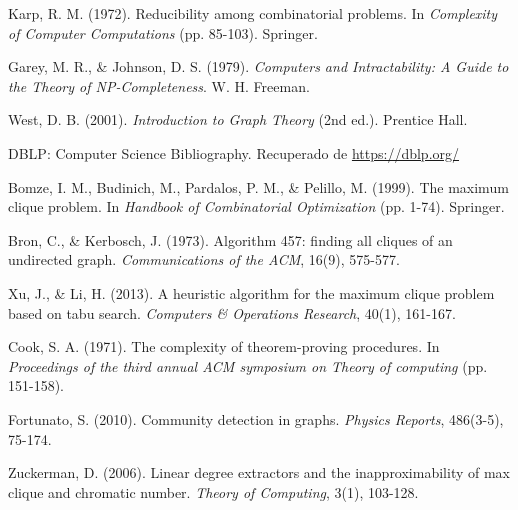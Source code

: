 \documentclass[12pt,a4paper]{report}
\begin{document}
\begin{thebibliography}{99}

Karp, R. M. (1972). Reducibility among combinatorial problems. In \textit{Complexity of Computer Computations} (pp. 85-103). Springer.

Garey, M. R., \& Johnson, D. S. (1979). \textit{Computers and Intractability: A Guide to the Theory of NP-Completeness}. W. H. Freeman.

West, D. B. (2001). \textit{Introduction to Graph Theory} (2nd ed.). Prentice Hall.

DBLP: Computer Science Bibliography. Recuperado de \url{https://dblp.org/}

Bomze, I. M., Budinich, M., Pardalos, P. M., \& Pelillo, M. (1999). The maximum clique problem. In \textit{Handbook of Combinatorial Optimization} (pp. 1-74). Springer.

Bron, C., \& Kerbosch, J. (1973). Algorithm 457: finding all cliques of an undirected graph. \textit{Communications of the ACM}, 16(9), 575-577.

Xu, J., \& Li, H. (2013). A heuristic algorithm for the maximum clique problem based on tabu search. \textit{Computers \& Operations Research}, 40(1), 161-167.

Cook, S. A. (1971). The complexity of theorem-proving procedures. In \textit{Proceedings of the third annual ACM symposium on Theory of computing} (pp. 151-158).

Fortunato, S. (2010). Community detection in graphs. \textit{Physics Reports}, 486(3-5), 75-174.

Zuckerman, D. (2006). Linear degree extractors and the inapproximability of max clique and chromatic number. \textit{Theory of Computing}, 3(1), 103-128.

\end{thebibliography}

\newpage

\end{document}
